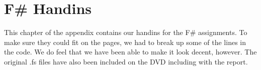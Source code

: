 \chapter{F\# Handins}
\label{Appendix_FSharp}
This chapter of the appendix contains our handins for the F\# assignments. To make sure they could fit on the pages, we had to break up some of the lines in the code. We do feel that we have been able to make it look decent, however. The original .fs files have also been included on the DVD including with the report. 




